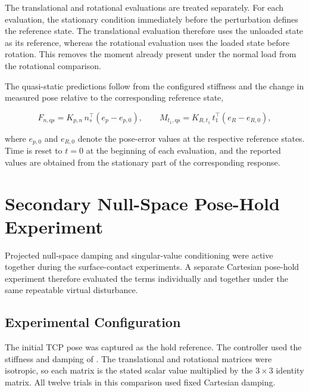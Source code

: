 The translational and rotational evaluations are treated separately. For each
evaluation, the stationary condition immediately before the perturbation defines
the reference state. The translational evaluation therefore uses the unloaded
state as its reference, whereas the rotational evaluation uses the loaded state
before rotation. This removes the moment already present under the normal load
from the rotational comparison.

The quasi-static predictions follow from the configured stiffness and the change
in measured pose relative to the corresponding reference state,

\[
F_{n,\mathrm{qs}}=K_{p,n}\,n_s^\top\left(e_p-e_{p,0}\right),
\qquad
M_{t_1,\mathrm{qs}}=K_{R,t_1}\,t_1^\top\left(e_R-e_{R,0}\right),
\]

where \mbox{\(e_{p,0}\)} and \mbox{\(e_{R,0}\)} denote the pose-error values at
the respective reference states. Time is reset to \mbox{\(t=0\)} at the
beginning of each evaluation, and the reported values are obtained from the
stationary part of the corresponding response.


\section{Secondary Null-Space Pose-Hold Experiment}
\label{sec:nullspace_hold_study}
\label{subsec:nullspace_automatic_method}

Projected null-space damping and singular-value conditioning were active
together during the surface-contact experiments. A separate Cartesian pose-hold
experiment therefore evaluated the terms individually and together under the
same repeatable virtual disturbance.


\subsection{Experimental Configuration}
\label{subsec:nullspace_pose_hold_configuration}

The initial TCP pose was captured as the hold reference. The controller used
the stiffness and damping of . The
translational and rotational matrices were isotropic, so each matrix is the
stated scalar value multiplied by the \(3\times3\) identity matrix. All
twelve trials in this comparison used fixed Cartesian damping.

